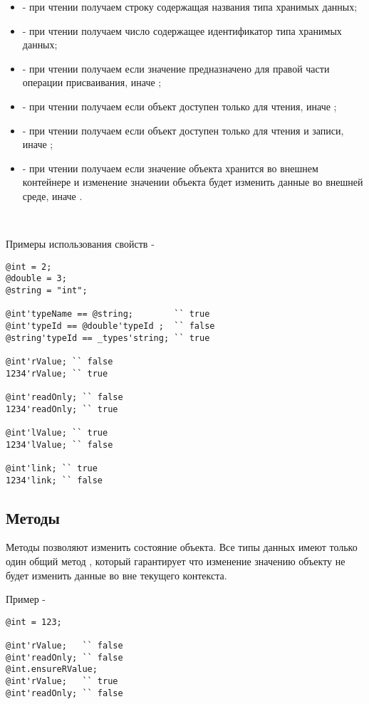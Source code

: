 \documentclass[a4paper, 14pt]{extarticle}
\newenvironment{icItems}
	{ \begin{itemize} [noitemsep,nolistsep] }
	{ \end{itemize} }
\begin{document}
\begin{icItems}
\item
	 - при чтении получаем строку содержащая названия типа хранимых данных;
\item
	 - при чтении получаем число содержащее идентификатор типа хранимых данных;
\item
	 - при чтении получаем \true{} если значение предназначено для правой части операции присваивания, иначе \false{};
\item
	 - при чтении получаем \true{} если объект доступен только для чтения, иначе \false{};
\item
	 - при чтении получаем \true{} если объект доступен только для чтения и записи, иначе \false{};
\item
	 - при чтении получаем \true{} если значение объекта хранится во внешнем контейнере и изменение значении объекта будет изменить данные во внешней среде, иначе \false{}.
\end{icItems}

\

\noindent Примеры использования свойств -
\begin{lstlisting}
@int = 2;
@double = 3;
@string = "int";

@int'typeName == @string;		 `` true
@int'typeId == @double'typeId ;	 `` false
@string'typeId == _types'string; `` true

@int'rValue; `` false
1234'rValue; `` true

@int'readOnly; `` false
1234'readOnly; `` true

@int'lValue; `` true
1234'lValue; `` false

@int'link; `` true
1234'link; `` false
\end{lstlisting}

\subsection{Методы}

Методы позволяют изменить состояние объекта. Все типы данных имеют только один общий метод , который гарантирует что изменение значению объекту не будет изменить данные во вне текущего контекста.

\noindent Пример -
\begin{lstlisting}
@int = 123;

@int'rValue;   `` false
@int'readOnly; `` false
@int.ensureRValue;
@int'rValue;   `` true
@int'readOnly; `` false
\end{lstlisting}
\end{document}
